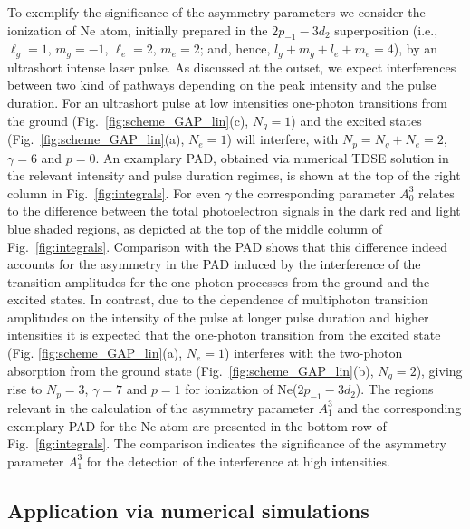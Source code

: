 To exemplify the significance of the asymmetry parameters we consider the ionization of Ne atom, initially prepared in the $2p_{-1}-3d_2$ superposition (i.e., $\ell_g = 1$, $m_g = -1$, $\ell_e = 2$, $m_e = 2$; and, hence, $l_g + m_g + l_e + m_e = 4$), by an ultrashort intense laser pulse. As discussed at the outset, we expect interferences between two kind of pathways depending on the peak intensity and the pulse duration. 
For an ultrashort pulse at low intensities one-photon transitions from the ground (Fig.\ \ref{fig:scheme_GAP_lin}(c), $N_g = 1$) and the excited states (Fig.\ \ref{fig:scheme_GAP_lin}(a), $N_e = 1$) will interfere, with $N_p = N_g + N_e = 2$, $\gamma = 6$ and $p=0$. An examplary PAD, obtained via numerical TDSE solution in the relevant intensity and pulse duration regimes, is shown at the top of the right column in Fig.~\ref{fig:integrals}. For even $\gamma$ the corresponding parameter $A_0^3$ relates to the difference between the total photoelectron signals in the dark red and light blue shaded regions, as depicted at the top of the middle column of Fig.~\ref{fig:integrals}. Comparison with the PAD shows that this difference indeed accounts for the asymmetry in the PAD induced by the interference of the transition amplitudes for the one-photon processes from the ground and the excited states. In contrast, due to the dependence of multiphoton transition amplitudes on the intensity of the pulse at longer pulse duration and higher intensities it is expected that the one-photon transition from the excited state (Fig. \ref{fig:scheme_GAP_lin}(a), $N_e = 1$) interferes with the two-photon absorption from the ground state (Fig.\ \ref{fig:scheme_GAP_lin}(b), $N_g = 2$), giving rise to $N_p = 3$, $\gamma = 7$ and $p=1$ for ionization of Ne($2p_{-1}-3d_2$). The regions relevant in the calculation of the asymmetry parameter $A_1^3$ and the corresponding exemplary PAD for the Ne atom are presented in the bottom row of Fig.~\ref{fig:integrals}. The comparison indicates the significance of the asymmetry parameter $A_1^3$ for the detection of the interference at high intensities.

\subsection*{Application via numerical simulations}


